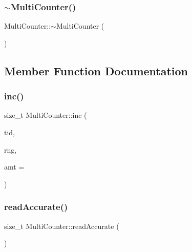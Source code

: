 \mbox{\label{classMultiCounter_a1e8f2f3db28990aee81a4edcf6299812}} 
\subsubsection{\texorpdfstring{$\sim$\+Multi\+Counter()}{~MultiCounter()}}
{\footnotesize\ttfamily Multi\+Counter\+::$\sim$\+Multi\+Counter (\begin{DoxyParamCaption}{ }\end{DoxyParamCaption})\hspace{0.3cm}{\ttfamily [inline]}}



\subsection{Member Function Documentation}
\mbox{\label{classMultiCounter_a6489735d57e1550c4c5b5dbfd188b5af}} 
\subsubsection{\texorpdfstring{inc()}{inc()}}
{\footnotesize\ttfamily size\+\_\+t Multi\+Counter\+::inc (\begin{DoxyParamCaption}\item[{const int}]{tid,  }\item[{\hyperlink{classRandomFNV1A}{Random\+F\+N\+V1A} $\ast$}]{rng,  }\item[{const size\+\_\+t}]{amt = {} }\end{DoxyParamCaption})\hspace{0.3cm}{\ttfamily [inline]}}

\mbox{\label{classMultiCounter_a049975cbc90e1f74438347869d2d43e5}} 
\subsubsection{\texorpdfstring{read\+Accurate()}{readAccurate()}}
{\footnotesize\ttfamily size\+\_\+t Multi\+Counter\+::read\+Accurate (\begin{DoxyParamCaption}{ }\end{DoxyParamCaption})\hspace{0.3cm}{\ttfamily [inline]}}

